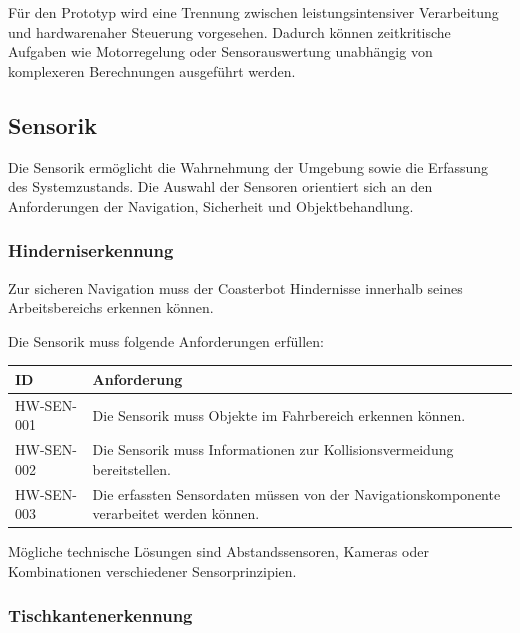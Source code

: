 Für den Prototyp wird eine Trennung zwischen leistungsintensiver
Verarbeitung und hardwarenaher Steuerung vorgesehen. Dadurch können
zeitkritische Aufgaben wie Motorregelung oder Sensorauswertung
unabhängig von komplexeren Berechnungen ausgeführt werden.

\subsection{Sensorik}\label{sensorik}

Die Sensorik ermöglicht die Wahrnehmung der Umgebung sowie die Erfassung
des Systemzustands. Die Auswahl der Sensoren orientiert sich an den
Anforderungen der Navigation, Sicherheit und Objektbehandlung.

\subsubsection{Hinderniserkennung}\label{hinderniserkennung}

Zur sicheren Navigation muss der Coasterbot Hindernisse innerhalb seines
Arbeitsbereichs erkennen können.

Die Sensorik muss folgende Anforderungen erfüllen:

\begin{longtable}[]{@{}
  >{\raggedright\arraybackslash}p{}
  >{\raggedright\arraybackslash}p{}@{}}
\toprule\noalign{}
\begin{minipage}[b]{\linewidth}\raggedright
ID
\end{minipage} & \begin{minipage}[b]{\linewidth}\raggedright
Anforderung
\end{minipage} \\
\midrule\noalign{}
\endhead
\bottomrule\noalign{}
\endlastfoot
HW-SEN-001 & Die Sensorik muss Objekte im Fahrbereich erkennen
können. \\
HW-SEN-002 & Die Sensorik muss Informationen zur Kollisionsvermeidung
bereitstellen. \\
HW-SEN-003 & Die erfassten Sensordaten müssen von der
Navigationskomponente verarbeitet werden können. \\
\end{longtable}

Mögliche technische Lösungen sind Abstandssensoren, Kameras oder
Kombinationen verschiedener Sensorprinzipien.

\subsubsection{Tischkantenerkennung}\label{tischkantenerkennung}

